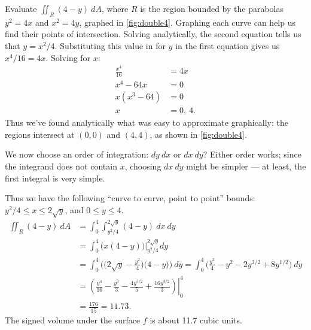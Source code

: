 \begin{example}\label{ex_double4}
Evaluate $\iint_R (4-y)\ dA$, where $R$ is the region bounded by the parabolas $y^2=4x$ and $x^2=4y$, graphed in \autoref{fig:double4}.
%
%
\solution
Graphing each curve can help us find their points of intersection. Solving analytically, the second equation tells us that $y=x^2/4$. Substituting this value in for $y$ in the first equation gives us $x^4/16 = 4x$. Solving for $x$:
\begin{align*}
\frac{x^4}{16} &= 4x\\
x^4-64x &=0\\
x(x^3-64) &=0\\
x&= 0,\ 4.
\end{align*}
Thus we've found analytically what was easy to approximate graphically: the regions intersect at $(0,0)$ and $(4,4)$, as shown in \autoref{fig:double4}. 

We now choose an order of integration: $dy\ dx$ or $dx\ dy$? Either order works; since the integrand does not contain $x$, choosing $dx\ dy$ might be simpler --- at least, the first integral is very simple.

Thus we have the following ``curve to curve, point to point'' bounds: $y^2/4\leq x\leq 2\sqrt y$, and $0\leq y\leq 4$. 
\begin{align*}
\iint_R (4-y)\ dA &= \int_0^4\int_{y^2/4}^{2\sqrt{y}}(4-y)\ dx\ dy\\
				&= \int_0^4 \big(x(4-y)\big)\Big|_{y^2/4}^{2\sqrt{y}} dy\\
				&= \int_0^4 \Big(\big(2\sqrt{y}-\frac{y^2}{4}\big)\big(4-y)\Big)\ dy = \int_0^4 \Big( \frac{y^3}{4}-y^2-2y^{3/2}+8y^{1/2}\Big)\ dy\\
				&= \left.\left(\frac{y^4}{16}-\frac{y^3}{3}-\frac{4y^{5/2}}5+\frac{16y^{3/2}}3\right)\right|_0^4\\
				&= \frac{176}{15} = 11.7\overline{3}.
\end{align*}
The signed volume under the surface $f$ is about 11.7 cubic units.
\end{example}

